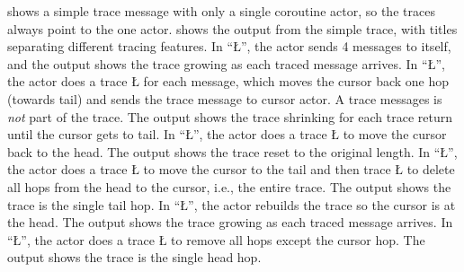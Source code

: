 \documentclass[openright,twoside]{report}
\begin{document}
 shows a simple trace message with only a single coroutine actor, so the traces always point to the one actor.
 shows the output from the simple trace, with titles separating different tracing features.
In ``\LGinlinetrue\LGbegin\lgrinde\L{}\endlgrinde\LGend{}'', the actor sends 4 messages to itself, and the output shows the trace growing as each traced message arrives.
In ``\LGinlinetrue\LGbegin\lgrinde\L{}\endlgrinde\LGend{}'', the actor does a trace \LGinlinetrue\LGbegin\lgrinde\L{}\endlgrinde\LGend{} for each message, which moves the cursor back one hop (towards tail) and sends the trace message to cursor actor.
A trace messages is \emph{not} part of the trace.
The output shows the trace shrinking for each trace return until the cursor gets to tail.
In ``\LGinlinetrue\LGbegin\lgrinde\L{}\endlgrinde\LGend{}'', the actor does a trace \LGinlinetrue\LGbegin\lgrinde\L{}\endlgrinde\LGend{} to move the cursor back to the head.
The output shows the trace reset to the original length.
In ``\LGinlinetrue\LGbegin\lgrinde\L{}\endlgrinde\LGend{}'', the actor does a trace \LGinlinetrue\LGbegin\lgrinde\L{}\endlgrinde\LGend{} to move the cursor to the tail and then trace \LGinlinetrue\LGbegin\lgrinde\L{}\endlgrinde\LGend{} to delete all hops from the head to the cursor, i.e., the entire trace.
The output shows the trace is the single tail hop.
In ``\LGinlinetrue\LGbegin\lgrinde\L{}\endlgrinde\LGend{}'', the actor rebuilds the trace so the cursor is at the head.
The output shows the trace growing as each traced message arrives.
In ``\LGinlinetrue\LGbegin\lgrinde\L{}\endlgrinde\LGend{}'', the actor does a trace \LGinlinetrue\LGbegin\lgrinde\L{}\endlgrinde\LGend{} to remove all hops except the cursor hop.
The output shows the trace is the single head hop.
\end{document}
